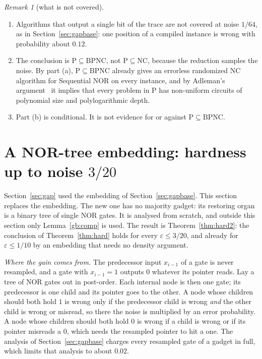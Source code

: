 \documentclass[11pt]{amsart}
\theoremstyle{definition}
\theoremstyle{remark}
\newtheorem{remark}[theorem]{Remark}
\newcommand{\eps}{\varepsilon}
\begin{document}
\begin{remark}[what is not covered]
\begin{enumerate}[label=(\roman*),leftmargin=2.4em]
\item Algorithms that output a single bit of the trace are not covered at noise $1/64$, as in
Section~\ref{sec:gapbase}: one position of a compiled instance is wrong with probability about $0.12$.
\item The conclusion is $\mathrm P\subseteq\mathrm{BPNC}$, not $\mathrm P\subseteq\mathrm{NC}$,
because the reduction samples the noise. By part (a), $\mathrm P\subseteq\mathrm{BPNC}$ already
gives an errorless randomized NC algorithm for Sequential NOR on every instance, and by Adleman's
argument~\cite{adleman} it implies that every problem in P has non-uniform circuits of polynomial
size and polylogarithmic depth.
\item Part (b) is conditional. It is not evidence for or against
$\mathrm P\subseteq\mathrm{BPNC}$.
\end{enumerate}
\end{remark}

\section{A NOR-tree embedding: hardness up to noise \texorpdfstring{$3/20$}{3/20}}\label{sec:tree}

Section~\ref{sec:gap} used the embedding of Section~\ref{sec:gapbase}. This section
replaces the embedding. The new one has no majority gadget: its restoring organ is a binary tree
of single NOR gates. It is analysed from scratch, and outside this section only Lemma~\ref{gb:comp} is used.
The result is Theorem~\ref{thm:hard2}: the conclusion of Theorem~\ref{thm:hard} holds for every
$\eps\le3/20$, and already for $\eps\le1/10$ by an embedding that needs no density argument.

\emph{Where the gain comes from.} The predecessor input $x_{i-1}$ of a gate is never resampled,
and a gate with $x_{i-1}=1$ outputs $0$ whatever its pointer reads. Lay a tree of NOR gates out in
post-order. Each internal node is then one gate; its predecessor is one child and its pointer goes
to the other. A node whose children should both hold $1$ is wrong only if the predecessor child
is wrong \emph{and} the other child is wrong or misread, so there the noise is multiplied by an
error probability. A node whose children should both hold $0$ is wrong if a child is wrong or if
its pointer misreads a $0$, which needs the resampled pointer to hit a one. The analysis of Section~\ref{sec:gapbase}
charges every resampled gate of a gadget in full, which limits that analysis to about $0.02$.
\end{document}

